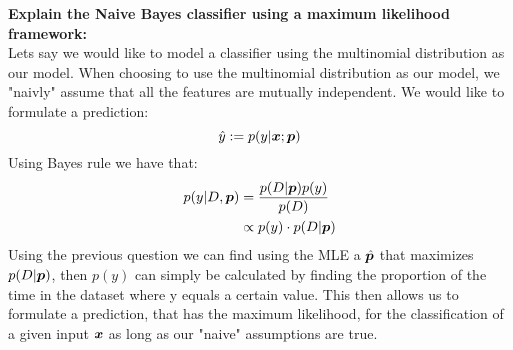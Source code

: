 \begin{appendices}
\begin{question}
    \textbf{Explain the Naive Bayes classifier using a maximum likelihood framework:}\\
    Lets say we would like to model a classifier using the multinomial distribution as our model. When choosing to use the multinomial distribution as our model, we "naivly" assume that all the features are mutually independent. We would like to formulate a prediction:
    \begin{equation}
        \hat{y} := p(y|\bm{x};\bm{p})
    \end{equation}
    Using Bayes rule we have that:
    \begin{align}
        p(y|D, \bm{p}) &{} = \frac{p(D | \bm{p}) p(y)}{p(D)} \\
        & \propto p(y) \cdot p(D | \bm{p})
    \end{align}
    Using the previous question we can find using the MLE a $\hat{\bm{p}}$ that maximizes $p(D | \bm{p})$, then $p(y)$ can simply be calculated by finding the proportion of the time in the dataset where y equals a certain value. This then allows us to formulate a prediction, that has the maximum likelihood, for the classification of a given input $\bm{x}$ as long as our "naive" assumptions are true. 
\end{question}



\end{appendices}
